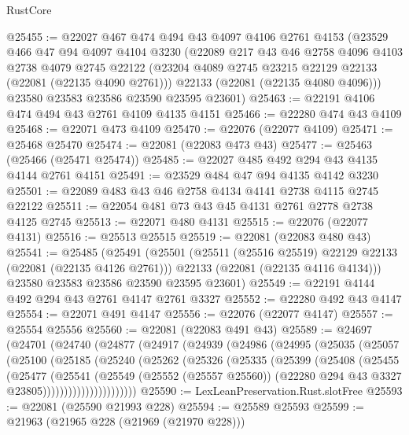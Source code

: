 \begin{lexlean}{RustCore}
\begin{coremodule}
@25455 := @22027
    @467
    @474
    @494
    @43
    @4097
    @4106
    @2761
    @4153
    (@23529
      @466
      @47
      @94
      @4097
      @4104
      @3230
      (@22089
        @217
        @43
        @46
        @2758
        @4096
        @4103
        @2738
        @4079
        @2745
        @22122
        (@23204 @4089 @2745 @23215 @22129 @22133 (@22081 (@22135 @4090 @2761)))
        @22133
        (@22081 (@22135 @4080 @4096)))
      @23580
      @23583
      @23586
      @23590
      @23595
      @23601)
@25463 := @22191 @4106 @474 @494 @43 @2761 @4109 @4135 @4151
@25466 := @22280 @474 @43 @4109
@25468 := @22071 @473 @4109
@25470 := @22076 (@22077 @4109)
@25471 := @25468 @25470
@25474 := @22081 (@22083 @473 @43)
@25477 := @25463 (@25466 (@25471 @25474))
@25485 := @22027 @485 @492 @294 @43 @4135 @4144 @2761 @4151
@25491 := @23529 @484 @47 @94 @4135 @4142 @3230
@25501 := @22089 @483 @43 @46 @2758 @4134 @4141 @2738 @4115 @2745 @22122
@25511 := @22054 @481 @73 @43 @45 @4131 @2761 @2778 @2738 @4125 @2745
@25513 := @22071 @480 @4131
@25515 := @22076 (@22077 @4131)
@25516 := @25513 @25515
@25519 := @22081 (@22083 @480 @43)
@25541 := @25485
    (@25491
      (@25501
        (@25511 (@25516 @25519) @22129 @22133 (@22081 (@22135 @4126 @2761)))
        @22133
        (@22081 (@22135 @4116 @4134)))
      @23580
      @23583
      @23586
      @23590
      @23595
      @23601)
@25549 := @22191 @4144 @492 @294 @43 @2761 @4147 @2761 @3327
@25552 := @22280 @492 @43 @4147
@25554 := @22071 @491 @4147
@25556 := @22076 (@22077 @4147)
@25557 := @25554 @25556
@25560 := @22081 (@22083 @491 @43)
@25589 := @24697
    (@24701
      (@24740
        (@24877
          (@24917
            (@24939
              (@24986
                (@24995
                  (@25035
                    (@25057
                      (@25100
                        (@25185
                          (@25240
                            (@25262
                              (@25326
                                (@25335
                                  (@25399
                                    (@25408
                                      (@25455
                                        (@25477
                                          (@25541
                                            (@25549
                                              (@25552 (@25557 @25560))
                                              (@22280 @294 @43 @3327 @23805))))))))))))))))))))))
@25590 := LexLeanPreservation.Rust.slotFree
@25593 := @22081 (@25590 @21993 @228)
@25594 := @25589 @25593
@25599 := @21963 (@21965 @228 (@21969 (@21970 @228)))

\end{coremodule}
\end{lexlean}
